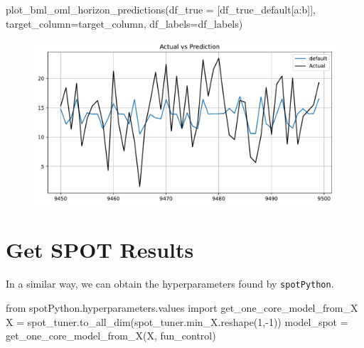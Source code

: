 \documentclass[
  letterpaper,
  DIV=11,
  numbers=noendperiod]{scrreprt}
\newenvironment{Shaded}{\begin{snugshade}}{\end{snugshade}}
\newcommand{\DecValTok}[1]{\textcolor[rgb]{0.68,0.00,0.00}{#1}}
\newcommand{\ImportTok}[1]{\textcolor[rgb]{0.00,0.46,0.62}{#1}}
\newcommand{\NormalTok}[1]{\textcolor[rgb]{0.00,0.23,0.31}{#1}}
\newcommand{\OperatorTok}[1]{\textcolor[rgb]{0.37,0.37,0.37}{#1}}
\begin{document}
\begin{Shaded}
\begin{Highlighting}[]
\NormalTok{plot\_bml\_oml\_horizon\_predictions(df\_true }\OperatorTok{=}\NormalTok{ [df\_true\_default[a:b]], target\_column}\OperatorTok{=}\NormalTok{target\_column,  df\_labels}\OperatorTok{=}\NormalTok{df\_labels)}
\end{Highlighting}
\end{Shaded}

\begin{figure}[H]

{\centering \includegraphics{13_spot_hpt_river_files/figure-pdf/cell-31-output-1.pdf}

}

\end{figure}

\hypertarget{get-spot-results-1}{%
\section{Get SPOT Results}\label{get-spot-results-1}}

In a similar way, we can obtain the hyperparameters found by
\texttt{spotPython}.

\begin{Shaded}
\begin{Highlighting}[]
\ImportTok{from}\NormalTok{ spotPython.hyperparameters.values }\ImportTok{import}\NormalTok{ get\_one\_core\_model\_from\_X}
\NormalTok{X }\OperatorTok{=}\NormalTok{ spot\_tuner.to\_all\_dim(spot\_tuner.min\_X.reshape(}\DecValTok{1}\NormalTok{,}\OperatorTok{{-}}\DecValTok{1}\NormalTok{))}
\NormalTok{model\_spot }\OperatorTok{=}\NormalTok{ get\_one\_core\_model\_from\_X(X, fun\_control)}
\end{Highlighting}
\end{Shaded}
\end{document}
